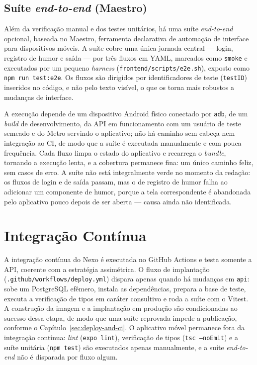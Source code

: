 \subsection{Suíte \textit{end-to-end} (Maestro)}\label{sec:test-mobile-e2e}

Além da verificação manual e dos testes unitários, há uma suíte
\textit{end-to-end} opcional, baseada no Maestro, ferramenta declarativa de
automação de interface para dispositivos móveis. A suíte cobre uma única
jornada central --- login, registro de humor e saída --- por três fluxos em
YAML, marcados como \texttt{smoke} e executados por um pequeno \textit{harness}
(\texttt{frontend/scripts/e2e.sh}), exposto como \texttt{npm run test:e2e}. Os
fluxos são dirigidos por identificadores de teste (\texttt{testID}) inseridos
no código, e não pelo texto visível, o que os torna mais robustos a mudanças de
interface.

A execução depende de um dispositivo Android físico conectado por \texttt{adb},
de um \textit{build} de desenvolvimento, da API em funcionamento com um usuário
de teste semeado e do Metro servindo o aplicativo; não há caminho sem cabeça
nem integração ao CI, de modo que a suíte é executada manualmente e com pouca
frequência. Cada fluxo limpa o estado do aplicativo e recarrega o
\textit{bundle}, tornando a execução lenta, e a cobertura permanece fina: um
único caminho feliz, sem casos de erro. A suíte não está integralmente verde no
momento da redação: os fluxos de login e de saída passam, mas o de registro de
humor falha ao adicionar um componente de humor, porque a tela correspondente é
abandonada pelo aplicativo pouco depois de ser aberta --- causa ainda não
identificada.

\section{Integração Contínua}\label{sec:test-ci}

A integração contínua do Nexo \cite{Humble_Farley_2011} é executada no GitHub
Actions e testa somente a API, coerente com a estratégia assimétrica. O fluxo
de implantação (\texttt{.github/workflows/deploy.yml}) dispara apenas quando há
mudanças em \texttt{api}: sobe um PostgreSQL efêmero, instala as dependências,
prepara a base de teste, executa a verificação de tipos em caráter consultivo e
roda a suíte com o Vitest. A construção da imagem e a implantação em produção
são condicionadas ao sucesso dessa etapa, de modo que uma suíte reprovada
impede a publicação, conforme o Capítulo~\ref{sec:deploy-and-ci}. O aplicativo
móvel permanece fora da integração contínua: \textit{lint} (\texttt{expo lint}),
verificação de tipos (\texttt{tsc --noEmit}) e a suíte unitária
(\texttt{npm test}) são executados apenas manualmente, e a suíte
\textit{end-to-end} não é disparada por fluxo algum.

